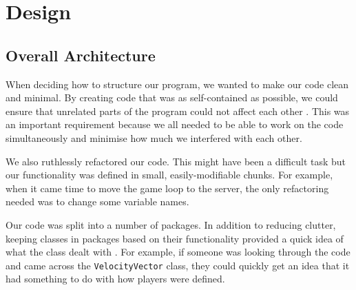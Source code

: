 \chapter{Design}
\label{cha:design}

%
%


\section{Overall Architecture}

When deciding how to structure our program, we wanted to make our code
clean and minimal. By creating code that was as self-contained as
possible, we could ensure that unrelated parts of the program could
not affect each other \cite{hunt1999}. This was an important
requirement because we all needed to be able to work on the code
simultaneously and minimise how much we interfered with each other.

We also ruthlessly refactored our code. This might have been a
difficult task but our functionality was defined in small,
easily-modifiable chunks. For example, when it came time to move the
game loop to the server, the only refactoring needed was to change
some variable names.

Our code was split into a number of packages. In addition to reducing
clutter, keeping classes in packages based on their functionality
provided a quick idea of what the class dealt with
\cite{horst2008:1}. For example, if someone was looking through the
code and came across the \texttt{VelocityVector} class, they could
quickly get an idea that it had something to do with how players were
defined.

